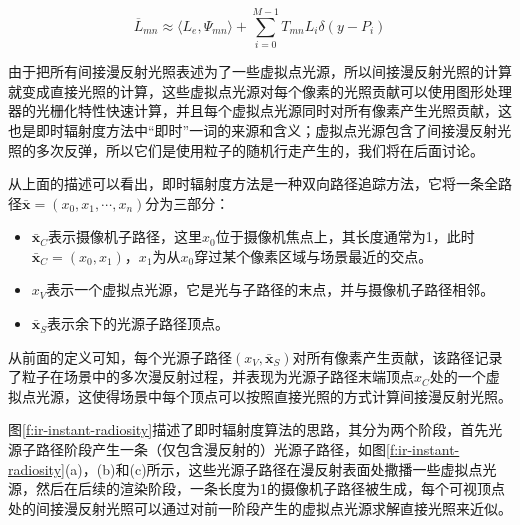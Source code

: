 \begin{equation}
		\overline{L}_{mn}\approx \langle L_e,\Psi_{mn}\rangle +\sum^{M-1}_{i=0} T_{mn}L_i\delta(y-P_i)
\end{equation}

由于把所有间接漫反射光照表述为了一些虚拟点光源，所以间接漫反射光照的计算就变成直接光照的计算，这些虚拟点光源对每个像素的光照贡献可以使用图形处理器的光栅化特性快速计算，并且每个虚拟点光源同时对所有像素产生光照贡献，这也是即时辐射度方法中“即时”一词的来源和含义；虚拟点光源包含了间接漫反射光照的多次反弹，所以它们是使用粒子的随机行走产生的，我们将在后面讨论。

从上面的描述可以看出，即时辐射度方法是一种双向路径追踪方法，它将一条全路径$\bar{\mathbf{x}}=(x_0,x_1,\cdots,x_n)$分为三部分：

\begin{itemize}
	\item $\bar{\mathbf{x}}_C$表示摄像机子路径，这里$x_0$位于摄像机焦点上，其长度通常为1，此时$\bar{\mathbf{x}}_C=(x_0,x_1)$，$x_1$为从$x_0$穿过某个像素区域与场景最近的交点。
	\item $x_V$表示一个虚拟点光源，它是光与子路径的末点，并与摄像机子路径相邻。
	\item $\bar{\mathbf{x}}_S$表示余下的光源子路径顶点。
\end{itemize}

从前面的定义可知，每个光源子路径$(x_V,\bar{\mathbf{x}}_S)$对所有像素产生贡献，该路径记录了粒子在场景中的多次漫反射过程，并表现为光源子路径末端顶点$x_C$处的一个虚拟点光源，这使得场景中每个顶点可以按照直接光照的方式计算间接漫反射光照。

图\ref{f:ir-instant-radiosity}描述了即时辐射度算法的思路，其分为两个阶段，首先光源子路径阶段产生一条（仅包含漫反射的）光源子路径，如图\ref{f:ir-instant-radiosity}(a)，(b)和(c)所示，这些光源子路径在漫反射表面处撒播一些虚拟点光源，然后在后续的渲染阶段，一条长度为1的摄像机子路径被生成，每个可视顶点处的间接漫反射光照可以通过对前一阶段产生的虚拟点光源求解直接光照来近似。

